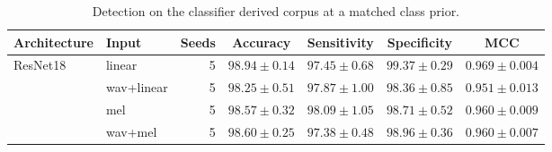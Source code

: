 \begin{table}[tbp]
\caption{Detection on the classifier derived corpus at a matched class prior.}\label{tab:regime}
\small
\begin{tabular}{@{}llrcccc@{}}
\toprule
Architecture & Input & Seeds & Accuracy & Sensitivity & Specificity & MCC \\
\midrule
ResNet18 & linear & 5 & $98.94 \pm 0.14$ & $97.45 \pm 0.68$ & $99.37 \pm 0.29$ & $0.969 \pm 0.004$ \\
 & wav+linear & 5 & $98.25 \pm 0.51$ & $97.87 \pm 1.00$ & $98.36 \pm 0.85$ & $0.951 \pm 0.013$ \\
 & mel & 5 & $98.57 \pm 0.32$ & $98.09 \pm 1.05$ & $98.71 \pm 0.52$ & $0.960 \pm 0.009$ \\
 & wav+mel & 5 & $98.60 \pm 0.25$ & $97.38 \pm 0.48$ & $98.96 \pm 0.36$ & $0.960 \pm 0.007$ \\
\bottomrule
\end{tabular}
\end{table}

